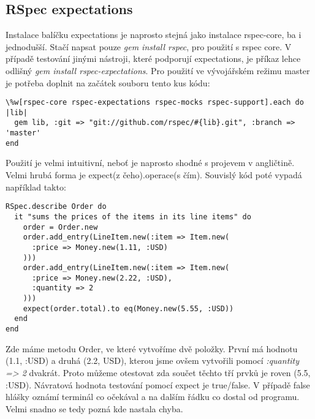 \subsection{RSpec expectations}
\par Instalace balíčku expectations je naprosto stejná jako instalace rspec-core, ba i jednodušší. Stačí napsat pouze \textit{gem install rspec}, pro použití s rspec core. V případě testování jinými nástroji, které podporují expectations, je příkaz lehce odlišný \textit{gem install rspec-expectations}. Pro použití ve vývojářském režimu master je potřeba doplnit na začátek souboru tento kus kódu:
\begin{verbatim}
\%w[rspec-core rspec-expectations rspec-mocks rspec-support].each do |lib|
  gem lib, :git => "git://github.com/rspec/#{lib}.git", :branch => 'master'
end
\end{verbatim}
\par Použití je velmi intuitivní, neboť je naprosto shodné s projevem v angličtině. Velmi hrubá forma je expect(z čeho).operace(s čím). Souvislý kód poté vypadá například takto:
\begin{verbatim}
RSpec.describe Order do
  it "sums the prices of the items in its line items" do
    order = Order.new
    order.add_entry(LineItem.new(:item => Item.new(
      :price => Money.new(1.11, :USD)
    )))
    order.add_entry(LineItem.new(:item => Item.new(
      :price => Money.new(2.22, :USD),
      :quantity => 2
    )))
    expect(order.total).to eq(Money.new(5.55, :USD))
  end
end
\end{verbatim}
\par Zde máme metodu Order, ve které vytvoříme dvě položky. První má hodnotu (1.1, :USD) a druhá (2.2, USD), kterou jsme ovšem vytvořili pomocí \textit{:quantity => 2} dvakrát. Proto můžeme otestovat zda součet těchto tří prvků je roven (5.5, :USD). Návratová hodnota testování pomocí expect je true/false. V případě false hlášky oznámí terminál co očekával a na dalším řádku co dostal od programu. Velmi snadno se tedy pozná kde nastala chyba.

